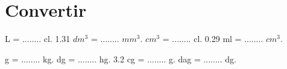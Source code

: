 \section{Convertir}

\begin{questions}
\begin{Large}
		\begin{multicols}{2}
		 L = ........ cl.
		\question \num{1.31} $dm^3$ = ........ $mm^3$.
		 $cm^3$ = ........ cl.
		\question \num{0.29} ml = ........ $cm^3$.
		
		 g = ........ kg.
		 dg = ........ hg.
		\question \num{3.2} cg = ........ g.
		 dag = ........ dg.
	\end{multicols}
\end{Large}
\end{questions}